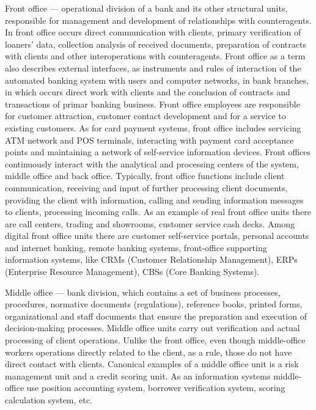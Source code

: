 Front office — operational division of a bank and its other structural units, responsible for management and development of relationships with counteragents. In front office occurs direct communication with clients, primary verification of loaners' data, collection analysis of received documents, preparation of contracts with clients and other interoperations with counteragents.
Front office as a term also describes external interfaces, as instruments and rules of interaction of the automated banking system with users and computer networks, in bank branches, in which occurs direct work with clients and the conclusion of contracts and transactions of primar banking business.
Front office employees are responsible for customer attraction, customer contact development and for a service to existing customers. 
As for card payment systems, front office includes servicing ATM network and POS terminals, interacting with payment card acceptance points and maintaining a network of self-service information devices.
Front offices continuously interact with the analytical and processing centers of the system, middle office and back office.
Typically, front office functions include client communication, receiving and input of further processing client documents, providing the client with information, calling and sending information messages to clients, processing incoming calls.
As an example of real front office units there are call centers, trading and showrooms, customer service cash decks.
Among digital front office units there are customer self-service portals, personal accounts and internet banking, remote banking systems, front-office supporting information systems, like CRMs (Customer Relationship Management), ERPs (Enterprise Resource Management), CBSs (Core Banking Systems).

Middle office — bank division, which contains a set of business processes, procedures, normative documents (regulations), reference books, printed forms, organizational and staff documents that ensure the preparation and execution of decision-making processes.
Middle office units carry out verification and actual processing of client operations. Unlike the front office, even though middle-office workers operations directly related to the client, as a rule, those do not have direct contact with clients.
Canonical examples of a middle office unit is a risk management unit and a credit scoring unit.
As an information systems middle-office use position accounting system, borrower verification system, scoring calculation system, etc.

